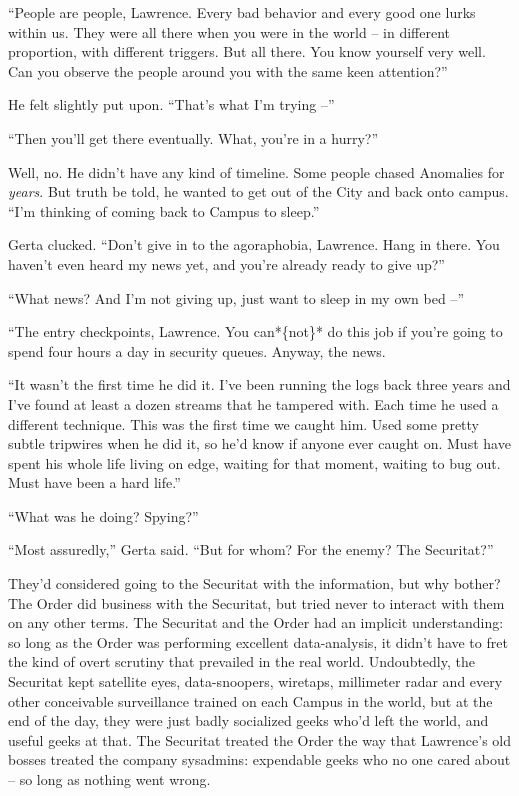“People are people, Lawrence. Every bad behavior and every good one 
lurks within us. They were all there when you were in the world -- in 
different proportion, with different triggers. But all there. You know 
yourself very well. Can you observe the people around you with the same 
keen attention?”

He felt slightly put upon. “That's what I'm trying --”

“Then you'll get there eventually. What, you're in a hurry?”

Well, no. He didn't have any kind of timeline. Some people chased 
Anomalies for \emph{years}. But truth be told, he wanted to get out of 
the City and back onto campus. “I'm thinking of coming back to Campus 
to sleep.”

Gerta clucked. “Don't give in to the agoraphobia, Lawrence. Hang in 
there. You haven't even heard my news yet, and you're already ready to 
give up?”

“What news? And I'm not giving up, just want to sleep in my own bed 
--”

“The entry checkpoints, Lawrence. You can*\{not\}* do this job if 
you're going to spend four hours a day in security queues. Anyway, the 
news.

“It wasn't the first time he did it. I've been running the logs back 
three years and I've found at least a dozen streams that he tampered 
with. Each time he used a different technique. This was the first time 
we caught him. Used some pretty subtle tripwires when he did it, so 
he'd know if anyone ever caught on. Must have spent his whole life 
living on edge, waiting for that moment, waiting to bug out. Must have 
been a hard life.”

“What was he doing? Spying?”

“Most assuredly,” Gerta said. “But for whom? For the enemy? The 
Securitat?”

They'd considered going to the Securitat with the information, but why 
bother? The Order did business with the Securitat, but tried never to 
interact with them on any other terms. The Securitat and the Order had 
an implicit understanding: so long as the Order was performing 
excellent data-analysis, it didn't have to fret the kind of overt 
scrutiny that prevailed in the real world. Undoubtedly, the Securitat 
kept satellite eyes, data-snoopers, wiretaps, millimeter radar and 
every other conceivable surveillance trained on each Campus in the 
world, but at the end of the day, they were just badly socialized geeks 
who'd left the world, and useful geeks at that. The Securitat treated 
the Order the way that Lawrence's old bosses treated the company 
sysadmins: expendable geeks who no one cared about -- so long as 
nothing went wrong.

